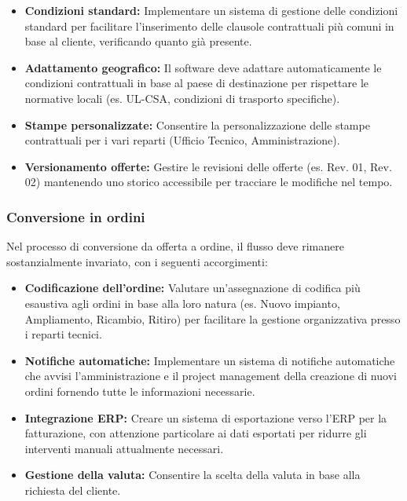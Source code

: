 \documentclass[12pt, a4paper]{article}
\begin{document}
\begin{itemize}
      \item \textbf{Condizioni standard:} Implementare un sistema di gestione delle condizioni standard per facilitare l'inserimento delle clausole contrattuali più comuni in base al cliente, verificando quanto già presente.

      \item \textbf{Adattamento geografico:} Il software deve adattare automaticamente le condizioni contrattuali in base al paese di destinazione per rispettare le normative locali (es. UL-CSA, condizioni di trasporto specifiche).

      \item \textbf{Stampe personalizzate:} Consentire la personalizzazione delle stampe contrattuali per i vari reparti (Ufficio Tecnico, Amministrazione).

      \item \textbf{Versionamento offerte:} Gestire le revisioni delle offerte (es. Rev. 01, Rev. 02) mantenendo uno storico accessibile per tracciare le modifiche nel tempo.
\end{itemize}

\subsubsection{Conversione in ordini}

Nel processo di conversione da offerta a ordine, il flusso deve rimanere sostanzialmente invariato, con i seguenti accorgimenti:

\begin{itemize}
      \item \textbf{Codificazione dell'ordine:} Valutare un'assegnazione di codifica più esaustiva agli ordini in base alla loro natura (es. Nuovo impianto, Ampliamento, Ricambio, Ritiro) per facilitare la gestione organizzativa presso i reparti tecnici.

      \item \textbf{Notifiche automatiche:} Implementare un sistema di notifiche automatiche che avvisi l'amministrazione e il project management della creazione di nuovi ordini fornendo tutte le informazioni necessarie.

      \item \textbf{Integrazione ERP:} Creare un sistema di esportazione verso l'ERP per la fatturazione, con attenzione particolare ai dati esportati per ridurre gli interventi manuali attualmente necessari.

      \item \textbf{Gestione della valuta:} Consentire la scelta della valuta in base alla richiesta del cliente.
\end{itemize}
\end{document}
